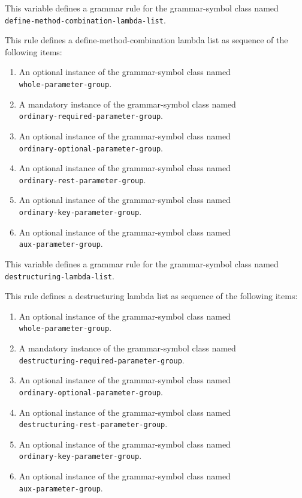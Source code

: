 
This variable defines a grammar rule for the grammar-symbol class
named \texttt{define-method-combination-lambda-list}.

This rule defines a define-method-combination lambda list as sequence
of the following items:

\begin{enumerate}
\item An optional instance of the grammar-symbol class named\\
  \texttt{whole-parameter-group}.
\item A mandatory instance of the grammar-symbol class named\\
  \texttt{ordinary-required-parameter-group}.
\item An optional instance of the grammar-symbol class named\\
  \texttt{ordinary-optional-parameter-group}.
\item An optional instance of the grammar-symbol class named\\
\texttt{ordinary-rest-parameter-group}.
\item An optional instance of the grammar-symbol class named\\
\texttt{ordinary-key-parameter-group}.
\item An optional instance of the grammar-symbol class named\\
\texttt{aux-parameter-group}.
\end{enumerate}


This variable defines a grammar rule for the grammar-symbol class
named \texttt{destructuring-lambda-list}.

This rule defines a destructuring lambda list as sequence of the
following items:

\begin{enumerate}
\item An optional instance of the grammar-symbol class named\\
  \texttt{whole-parameter-group}.
\item A mandatory instance of the grammar-symbol class named\\
  \texttt{destructuring-required-parameter-group}.
\item An optional instance of the grammar-symbol class named\\
  \texttt{ordinary-optional-parameter-group}.
\item An optional instance of the grammar-symbol class named\\
\texttt{destructuring-rest-parameter-group}.
\item An optional instance of the grammar-symbol class named\\
\texttt{ordinary-key-parameter-group}.
\item An optional instance of the grammar-symbol class named\\
\texttt{aux-parameter-group}.
\end{enumerate}

